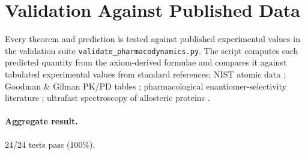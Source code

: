 \documentclass[twocolumn,10pt,a4paper]{article}
\theoremstyle{definition}
\theoremstyle{remark}
\begin{document}
\section{Validation Against Published Data}

Every theorem and prediction is tested against published experimental values in the validation suite \texttt{validate\_pharmacodynamics.py}. The script computes each predicted quantity from the axiom-derived formulae and compares it against tabulated experimental values from standard references: NIST atomic data \citep{nist_asd}; Goodman \& Gilman PK/PD tables \citep{goodman_gilman}; pharmacological enantiomer-selectivity literature \citep{ariens_1984,adams_1976}; ultrafast spectroscopy of allosteric proteins \citep{austin_1975,hamm_zanni_2011,leitner_2008}.

\paragraph{Aggregate result.} 24/24 tests pass (100\%).
\end{document}
